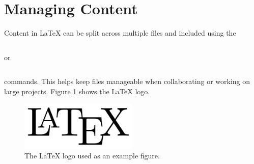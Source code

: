 \section{Managing Content}
Content in LaTeX can be split across multiple files and included using the
\begin{verbatim}

\end{verbatim}
or
\begin{verbatim}

\end{verbatim}
commands. This helps keep files manageable when collaborating or working on large projects. Figure
\ref{fig:latex-logo}
shows the LaTeX logo.
\begin{figure}[h]
\centering
\includegraphics[width=0.5\textwidth]{figs/logo.png}
\caption{The LaTeX logo used as an example figure.}
\label{fig:latex-logo}
\end{figure}
